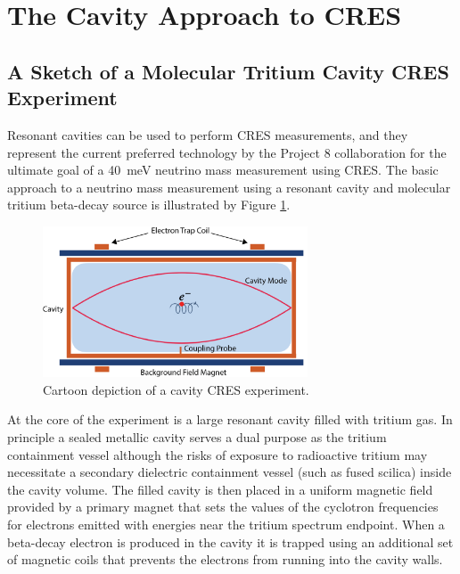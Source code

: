 \section{The Cavity Approach to CRES}
\label{sec:chap6-cavity-approach}

\subsection{A Sketch of a Molecular Tritium Cavity CRES Experiment}

Resonant cavities can be used to perform CRES measurements, and they represent the current preferred technology by the Project 8 collaboration for the ultimate goal of a 40~meV neutrino mass measurement using CRES. The basic approach to a neutrino mass measurement using a resonant cavity and molecular tritium beta-decay source is illustrated by Figure \ref{fig:chap6-cav-cartoon}.
\begin{figure}[htbp]
    \centering
    \includegraphics*[width=0.7\textwidth]{figs/Chapter-6/230606_cavity_cartoon.png}
    \caption{\label{fig:chap6-cav-cartoon} Cartoon depiction of a cavity CRES experiment.}
\end{figure}

At the core of the experiment is a large resonant cavity filled with tritium gas. In principle a sealed metallic cavity serves a dual purpose as the tritium containment vessel although the risks of exposure to radioactive tritium may necessitate a secondary dielectric containment vessel (such as fused scilica) inside the cavity volume. The filled cavity is then placed in a uniform magnetic field provided by a primary magnet that sets the values of the cyclotron frequencies for electrons emitted with energies near the tritium spectrum endpoint. When a beta-decay electron is produced in the cavity it is trapped using an additional set of magnetic coils that prevents the electrons from running into the cavity walls.

